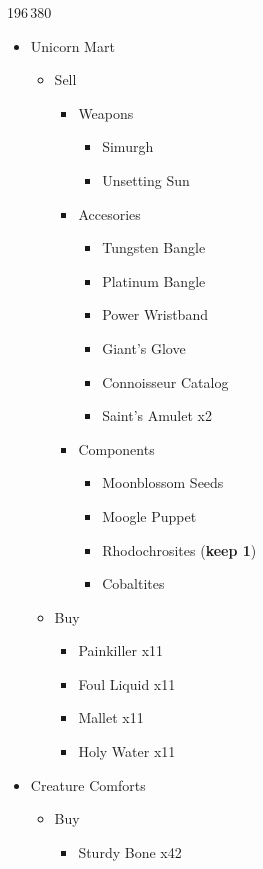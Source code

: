 \begin{shop}{196\,380}
	\begin{itemize}
		\item Unicorn Mart
			\begin{itemize}
				\item Sell
					\begin{itemize}
						\item Weapons
							\begin{itemize}
								\item Simurgh
								\item Unsetting Sun
							\end{itemize}
						\item Accesories
							\begin{itemize}
								\item Tungsten Bangle
								\item Platinum Bangle
								\item Power Wristband
								\item Giant's Glove
								\item Connoisseur Catalog
								\item Saint's Amulet x2
							\end{itemize}
						\item Components
							\begin{itemize}
								\item Moonblossom Seeds
								\item Moogle Puppet
								\item Rhodochrosites (\textbf{keep 1})
								\item Cobaltites
							\end{itemize}
					\end{itemize}
				\item Buy
					\begin{itemize}
						\item Painkiller x11
						\item Foul Liquid x11
						\item Mallet x11
						\item Holy Water x11
					\end{itemize}
			\end{itemize}
		\item Creature Comforts
			\begin{itemize}
				\item Buy
					\begin{itemize}
						\item Sturdy Bone x42

\end{itemize}
\end{itemize}
\end{itemize}
\end{shop}

